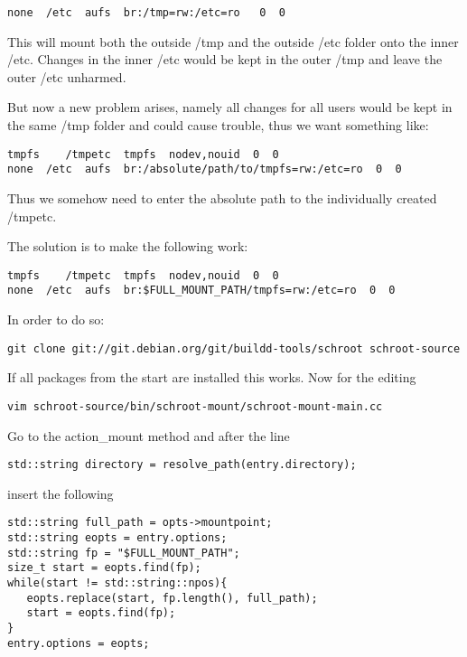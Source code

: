 \documentclass[a4paper]{book}
\begin{document}
\begin{verbatim}
none  /etc  aufs  br:/tmp=rw:/etc=ro   0  0
\end{verbatim}

This will mount both the outside /tmp and the outside /etc folder onto the
inner /etc. Changes in the inner /etc would be kept in the outer /tmp and leave
the outer /etc unharmed.

But now a new problem arises, namely all changes for all users would be kept in
the same /tmp folder and could cause trouble, thus we want something like:

\begin{verbatim}
tmpfs    /tmpetc  tmpfs  nodev,nouid  0  0
none  /etc  aufs  br:/absolute/path/to/tmpfs=rw:/etc=ro  0  0
\end{verbatim}

Thus we somehow need to enter the absolute path to the individually created /tmpetc.

The solution is to make the following work:

\begin{verbatim}
tmpfs    /tmpetc  tmpfs  nodev,nouid  0  0
none  /etc  aufs  br:$FULL_MOUNT_PATH/tmpfs=rw:/etc=ro  0  0
\end{verbatim}

In order to do so:

\begin{verbatim}
git clone git://git.debian.org/git/buildd-tools/schroot schroot-source
\end{verbatim}

If all packages from the start are installed this works.
Now for the editing

\begin{verbatim}
vim schroot-source/bin/schroot-mount/schroot-mount-main.cc
\end{verbatim}

Go to the action\_mount method and after the line

\begin{verbatim}
std::string directory = resolve_path(entry.directory);
\end{verbatim}

insert the following

\begin{verbatim}
std::string full_path = opts->mountpoint;
std::string eopts = entry.options;
std::string fp = "$FULL_MOUNT_PATH";
size_t start = eopts.find(fp);
while(start != std::string::npos){
   eopts.replace(start, fp.length(), full_path);
   start = eopts.find(fp);
}
entry.options = eopts;
\end{verbatim}
\end{document}
